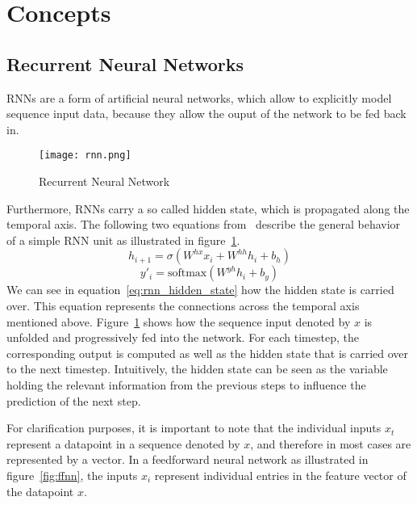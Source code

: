 \section{Concepts}
\subsection{Recurrent Neural Networks}\label{rnn}
RNNs are a form of artificial neural networks, which allow to explicitly model sequence input data, because they allow the ouput of the network to be fed back in.
\begin{figure}[ht]
	\centering
	\captionsetup{width=0.8\textwidth}
    \texttt{[image: rnn.png]}
    \caption{Recurrent Neural Network}
    \label{fig:rnn}
\end{figure}
Furthermore, RNNs carry a so called hidden state, which is propagated along the temporal axis.
The following two equations from~\cite{rnn_survey} describe the general behavior of a simple RNN unit as illustrated in figure~\ref{fig:rnn}.
\begin{equation}\label{eq:rnn_hidden_state}
    h_{i+1} = \sigma(W^{hx}x_i + W^{hh}h_i + b_h)
\end{equation}
\begin{equation}\label{eq:rnn_output}
    y'_i = \text{softmax}(W^{yh}h_i + b_y)
\end{equation}
We can see in equation~\ref{eq:rnn_hidden_state} how the hidden state is carried over.
This equation represents the connections across the temporal axis mentioned above.
Figure~\ref{fig:rnn} shows how the sequence input denoted by $x$ is unfolded and progressively fed into the network.
For each timestep, the corresponding output is computed as well as the hidden state that is carried over to the next timestep.
Intuitively, the hidden state can be seen as the variable holding the relevant information from the previous steps to influence the prediction of the next step.
\par
For clarification purposes, it is important to note that the individual inputs $x_t$ represent a datapoint in a sequence denoted by $x$, and therefore in most cases are represented by a vector.
In a feedforward neural network as illustrated in figure~\ref{fig:ffnn}, the inputs $x_i$ represent individual entries in the feature vector of the datapoint $x$.
